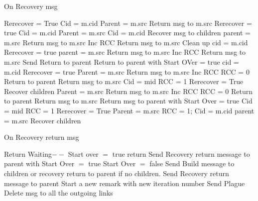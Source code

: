 \documentclass{article}
\begin{document}
\begin{algorithm}
\caption{On Recovery msg}
\label{Recovery message received}
\begin{algorithmic}[1]
		\State Rerecover = True
		\State Cid = m.cid
		\State Parent = m.src
	\Else
		\State Return msg to m.src
		\State Rerecover = true
		\State Cid = m.cid
		\State Parent = m.src
	\EndIf
{}
	\State Cid = m.cid
	\State Recover msg to children
	\State parent = m.src
			\State Return msg to m.src
			\State Inc RCC
			\State Return msg to m.src
				\State Clean up
			\EndIf
		\Else
			\State cid = m.cid
			\State Rerecover = true
			\State parent = m.src
		\EndIf
	\Else
			\State Return msg to m.src
			\State Inc RCC
			\State Return msg to m.src
				\State Send Return to parent
			\EndIf
		\Else
			\State Return to parent with Start OVer = true
			\State cid = m.cid
			\State Rerecover = true
			\State Parent = m.src
		\EndIf
	\EndIf
{}
			\State Return msg to m.src
			\State Inc RCC
				\State RCC = 0
				\State Return to parent
			\EndIf
			\State Return msg to m.src
		\Else
			\State Cid = mid
			\State RCC = 1
				\State Rerecover = True	
			\Else 
				\State Recover children
			\EndIf
			\State Parent = m.src
		\EndIf
	\Else
			\State Return msg to m.src
			\State Inc RCC
				\State RCC = 0
				\State Return to parent
			\EndIf
			\State Return msg to m.src
		\Else
			\State Return msg to parent with Start Over = true
			\State Cid = mid
			\State RCC = 1
			\State Rerecover = True
			\State Parent = m.src
		\EndIf
	\EndIf
{}
	\State RCC = 1;
	\State Cid = m.cid
	\State parent = m.src
	\State Recover children
\EndIf
\EndProcedure
\end{algorithmic}
\end{algorithm}	


\begin{algorithm}
\caption{On Recovery return msg}
\label{Recovery return message received}
\begin{algorithmic}[1]
\State Return
\EndIf
\State Waiting$--$
\State Start over $=$ true
\EndIf
{}
\State return
\EndIf
{}
\State Send Recovery return message to parent with Start Over $=$ true
\State Start Over $=$ false
\State Send Build message to children or recovery return to parent if no children.
\State Send Recovery return message to parent
\EndIf
{}
\State Start a new remark with new iteration number
\State Send Plague Delete msg to all the outgoing links
\EndIf
\EndProcedure
\end{algorithmic}
\end{algorithm}	
\end{document}
